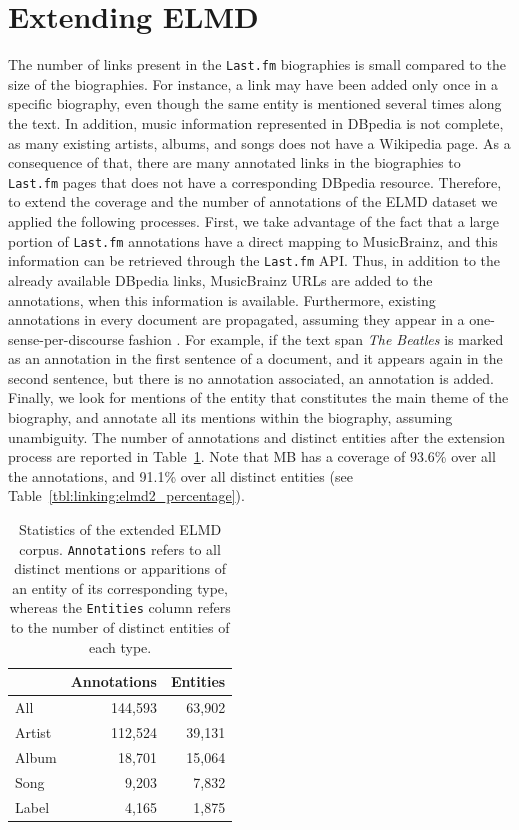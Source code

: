 \section{Extending ELMD}
\label{sec:linking:extending}

The number of links present in the \texttt{Last.fm} biographies is small compared to the size of the biographies. For instance, a link may have been added only once in a specific biography, even though the same entity is mentioned several times along the text. 
In addition, music information represented in DBpedia is not complete, as many existing artists, albums, and songs does not have a Wikipedia page. As a consequence of that, there are many annotated links in the biographies to \texttt{Last.fm} pages that does not have a corresponding DBpedia resource.
Therefore, to extend the coverage and the number of annotations of the \textsc{ELMD} dataset we applied the following processes. First, we take advantage of the fact that a large portion of \texttt{Last.fm} annotations have a direct mapping to MusicBrainz, and this information can be retrieved through the \texttt{Last.fm} API. Thus, in addition to the already available DBpedia links, MusicBrainz URLs are added to the annotations, when this information is available. Furthermore, existing annotations in every document are propagated, assuming they appear in a one-sense-per-discourse fashion \citep{gale1992one}. For example, if the text span \textit{The Beatles} is marked as an annotation in the first sentence of a document, and it appears again in the second sentence, but there is no annotation associated, an annotation is added. Finally, we look for mentions of the entity that constitutes the main theme of the biography, and annotate all its mentions within the biography, assuming unambiguity. The number of annotations and distinct entities after the extension process are reported in Table~\ref{tbl:linking:elmd2}. Note that MB has a coverage of 93.6\% over all the annotations, and 91.1\% over all distinct entities (see Table~\ref{tbl:linking:elmd2_percentage}).

\begin{table}[]
\centering
\begin{tabular}{| l| r |r |}
\hline
& \textbf{Annotations} & \textbf{Entities} \\ \hline
All    & 144,593      & 63,902    \\ \hline
Artist & 112,524      & 39,131    \\ \hline
Album  & 18,701       & 15,064    \\ \hline
Song  & 9,203        & 7,832     \\ \hline
Label  & 4,165        & 1,875    
\\ \hline
\end{tabular}
\caption{Statistics of the extended ELMD corpus. \texttt{Annotations} refers to all distinct mentions or apparitions of an entity of its corresponding type, whereas the \texttt{Entities} column refers to the number of distinct entities of each type.}
\label{tbl:linking:elmd2}
\end{table}

